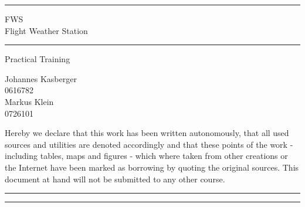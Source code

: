 \documentclass[a4paper,english,12pt,oneside]{memoir}
\newcommand\HRule{\noindent\rule{\linewidth}{1.5pt}}
\begin{document}
\begin{titlingpage}
    \HRule
    \begin{center}
        \LARGE FWS \\ 
        Flight Weather Station
    \end{center}
    \HRule
    \begin{center}
        \Large Practical Training \\
        
     \end{center}
    \begin{center}
        \vspace{30pt}
        \normalsize Johannes Kasberger \\
        0616782 \\
        \vspace{15pt}
        Markus Klein \\
        0726101
     \end{center}
     \newpage
     
\noindent Hereby we declare that this work has been written autonomously, that all used sources and utilities are denoted accordingly and that these points of the work - including tables, maps and figures - which where taken from other creations or the Internet have been marked as borrowing by quoting the original sources. This document at hand will not be submitted to any other course.
\vspace*{30pt}
\noindent

\rule{0.3\textwidth}{0.4pt} \hspace{50pt} \rule{0.3\textwidth}{0.4pt}
 \end{titlingpage}

\tableofcontents
\newpage
\listoffigures
\listoftables








\end{document}

